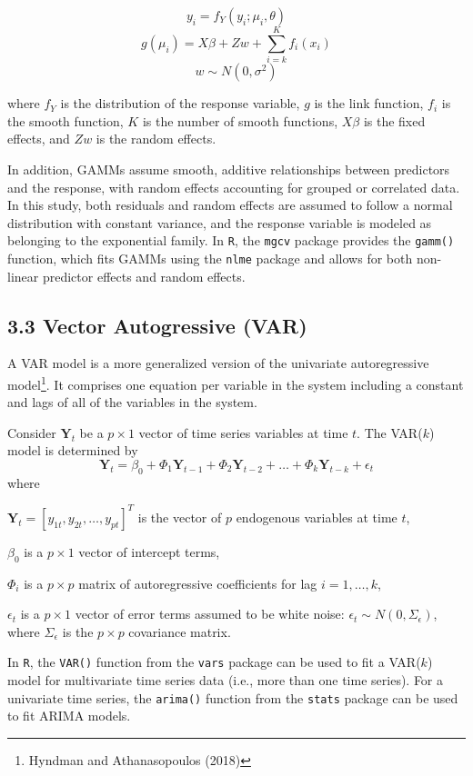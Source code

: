 \documentclass[
  letterpaper,
  DIV=11,
  numbers=noendperiod]{scrartcl}
\begin{document}
\[y_i=f_Y(y_i; \mu_i, \theta)\]
\[g(\mu_i)=X\beta+Zw+\sum_{i=k}^Kf_i(x_i)\] \[w\sim N(0, \sigma^2)\]

where \(f_Y\) is the distribution of the response variable, \(g\) is the
link function, \(f_i\) is the smooth function, \(K\) is the number of
smooth functions, \(X\beta\) is the fixed effects, and \(Zw\) is the
random effects.

In addition, GAMMs assume smooth, additive relationships between
predictors and the response, with random effects accounting for grouped
or correlated data. In this study, both residuals and random effects are
assumed to follow a normal distribution with constant variance, and the
response variable is modeled as belonging to the exponential family. In
\texttt{R}, the \texttt{mgcv} package provides the \texttt{gamm()}
function, which fits GAMMs using the \texttt{nlme} package and allows
for both non-linear predictor effects and random effects.

\subsection{3.3 Vector Autogressive
(VAR)}\label{vector-autogressive-var}

A VAR model is a more generalized version of the univariate
autoregressive model\footnote{Hyndman and Athanasopoulos (2018)}. It
comprises one equation per variable in the system including a constant
and lags of all of the variables in the system.

Consider \(\mathbf{Y}_t\) be a \(p\times 1\) vector of time series
variables at time \(t\). The VAR(\(k\)) model is determined by \[
\mathbf{Y}_t=\beta_0+\Phi_1\mathbf{Y}_{t-1}+\Phi_2\mathbf{Y}_{t-2}+\dots + \Phi_k\mathbf{Y}_{t-k}+\epsilon_t
\] where

\(\mathbf{Y}_t = [y_{1t}, y_{2t}, \dots, y_{pt}]^T\) is the vector of
\(p\) endogenous variables at time \(t\),

\(\beta_0\) is a \(p\times 1\) vector of intercept terms,

\(\Phi_i\) is a \(p\times p\) matrix of autoregressive coefficients for
lag \(i=1, \dots, k\),

\(\epsilon_t\) is a \(p\times 1\) vector of error terms assumed to be
white noise: \(\epsilon_t\sim N(0, \Sigma_\epsilon)\), where
\(\Sigma_\epsilon\) is the \(p\times p\) covariance matrix.

In \texttt{R}, the \texttt{VAR()} function from the \texttt{vars}
package can be used to fit a VAR(\(k\)) model for multivariate time
series data (i.e., more than one time series). For a univariate time
series, the \texttt{arima()} function from the \texttt{stats} package
can be used to fit ARIMA models.
\end{document}
